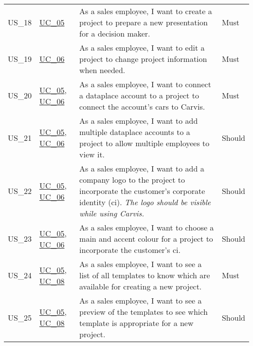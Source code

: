 \begin{footnotesize}
\begin{longtable}[L L L L]{ p{} p{} p{} p{} }
      \rowcolor{Gray}
      \hypertarget{Ref:US18}{US\_18} & \hyperlink{Ref:UC5}{UC\_05} & As a sales employee, I want to create a project to prepare a new presentation for a decision maker. & Must \\
      
      \hypertarget{Ref:US19}{US\_19} & \hyperlink{Ref:UC6}{UC\_06} & As a sales employee, I want to edit a project to change project information when needed. & Must \\
      
      \rowcolor{Gray}
      \hypertarget{Ref:US20}{US\_20} & \hyperlink{Ref:UC5}{UC\_05}, \newline \hyperlink{Ref:UC6}{UC\_06} & As a sales employee, I want to connect a \gls{dataplace} account to a project to connect the account's cars to Carvis. & Must \\
      
      \hypertarget{Ref:US21}{US\_21} & \hyperlink{Ref:UC5}{UC\_05}, \newline \hyperlink{Ref:UC6}{UC\_06} & As a sales employee, I want to add multiple \gls{dataplace} accounts to a project to allow multiple employees to view it. & Should \\
      
      \rowcolor{Gray}
      \hypertarget{Ref:US22}{US\_22} & \hyperlink{Ref:UC5}{UC\_05}, \newline \hyperlink{Ref:UC6}{UC\_06} & As a sales employee, I want to add a company logo to the project to incorporate the customer's corporate identity (\gls{ci}). 
      \newline
      \emph{The logo should be visible while using Carvis.} & Should
      \\
      
      \hypertarget{Ref:US23}{US\_23} & \hyperlink{Ref:UC5}{UC\_05}, \newline \hyperlink{Ref:UC6}{UC\_06} & As a sales employee, I want to choose a main and accent colour for a project to incorporate the customer's \gls{ci}. & Should \\
      
      \rowcolor{Gray}
      \hypertarget{Ref:US24}{US\_24} & \hyperlink{Ref:UC5}{UC\_05}, \newline \hyperlink{Ref:UC8}{UC\_08} & As a sales employee, I want to see a list of all templates to know which are available for creating a new project. & Must \\
      
      \hypertarget{Ref:US25}{US\_25} & \hyperlink{Ref:UC5}{UC\_05}, \newline \hyperlink{Ref:UC8}{UC\_08} & As a sales employee, I want to see a preview of the templates to see which template is appropriate for a new project. & Should \\
      

\end{longtable}
\end{footnotesize}
